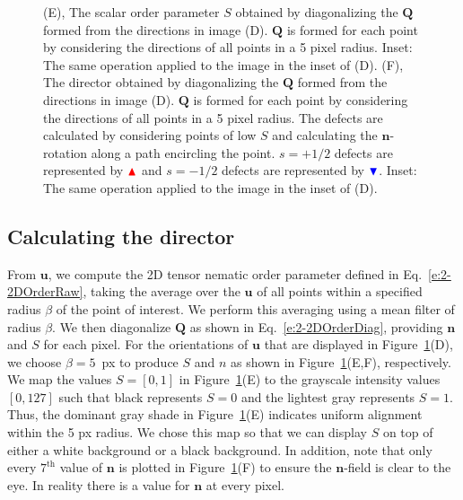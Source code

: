 \begin{figure}[H]
{(E), The scalar order parameter $S$ obtained by diagonalizing the $\mathbf{Q}$ formed from the directions in image (D).
$\mathbf{Q}$ is formed for each point by considering the directions of all points in a 5 pixel radius.
Inset: The same operation applied to the image in the inset of (D).
(F), The director obtained by diagonalizing the $\mathbf{Q}$ formed from the directions in image (D).
$\mathbf{Q}$ is formed for each point by considering the directions of all points in a 5 pixel radius.
The defects are calculated by considering points of low $S$ and calculating the $\mathbf{n}$-rotation along a path encircling the point.
$s = +1/2$ defects are represented by ${\color{red} \blacktriangle  } $  and $s = -1/2$ defects are represented by ${ \color{blue} \blacktriangledown  } $.
Inset: The same operation applied to the image in the inset of (D).}\label{f:3-CEDF2}
\end{figure}
\newpage
\subsection{Calculating the director}
From $\mathbf{u}$, we compute the 2D tensor nematic order parameter defined in Eq.~\ref{e:2-2DOrderRaw}, taking the average over the $\mathbf{u}$ of all points within a specified radius $\beta$ of the point of interest.
We perform this averaging using a mean filter of radius $\beta$.
We then diagonalize $\mathbf{Q}$ as shown in Eq.~\ref{e:2-2DOrderDiag}, providing $\mathbf{n}$ and $S$ for each pixel.
For the orientations of $\mathbf{u}$ that are displayed in Figure~\ref{f:3-CEDF2}(D), we choose $\beta = 5$~px to produce $S$ and $n$ as shown in Figure~\ref{f:3-CEDF2}(E,F), respectively.
We map the values $S = [0, 1]$ in Figure~\ref{f:3-CEDF2}(E) to the grayscale intensity values $[0,127]$ such that black represents $S = 0$ and the lightest gray represents $S = 1$.
Thus, the dominant gray shade in Figure~\ref{f:3-CEDF2}(E) indicates uniform alignment within the 5 px radius.
We chose this map so that we can display $S$ on top of either a white background or a black background.
In addition, note that only every $7^{\textrm{th}}$ value of $\mathbf{n}$ is plotted in Figure~\ref{f:3-CEDF2}(F) to ensure the $\mathbf{n}$-field is clear to the eye.
In reality there is a value for $\mathbf{n}$ at every pixel.

